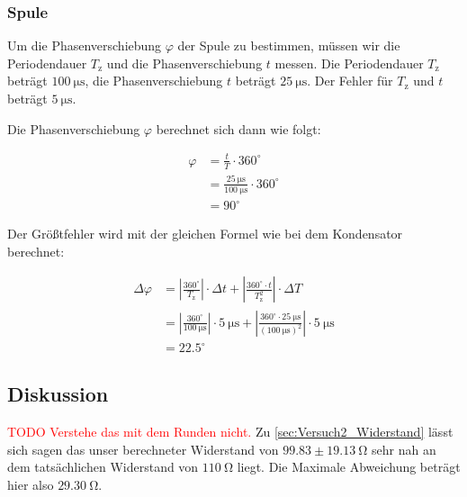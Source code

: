         \subsubsection{Spule}
        \label{sec:Versuch2_Spule}
            
            Um die Phasenverschiebung $\varphi$ der Spule zu bestimmen, müssen wir die Periodendauer $T_{\mathrm{z}}$ und die Phasenverschiebung $t$ messen.
            Die Periodendauer $T_{\mathrm{z}}$ beträgt $100\ \mathrm{\mu s}$, die Phasenverschiebung $t$ beträgt $25\ \mathrm{\mu s}$. Der Fehler für $T_{\mathrm{z}}$ und $t$ beträgt $5\ \mathrm{\mu s}$.

            Die Phasenverschiebung $\varphi$ berechnet sich dann wie folgt:

            \begin{equation}
                \begin{aligned}
                    \varphi &= \frac{t}{T} \cdot 360^{\circ}\\
                         &= \frac{25\ \mathrm{\mu s}}{100\ \mathrm{\mu s}} \cdot 360^{\circ}\\
                         &= 90^{\circ}
                \end{aligned}
                \label{eq:Versuch2_Spule_Phasenverschiebung}
            \end{equation}

            Der Größtfehler wird mit der gleichen Formel wie bei dem Kondensator berechnet:

            \begin{equation}
                \begin{aligned}
                    \Delta \varphi &= \left|\frac{360^{\circ}}{T_{\mathrm{z}}}\right| \cdot \Delta t + \left|\frac{360^{\circ} \cdot t}{T_{\mathrm{z}}^{2}}\right| \cdot \Delta T\\
                                   &= \left|\frac{360^{\circ}}{100\ \mathrm{\mu s}}\right| \cdot 5\ \mathrm{\mu s} + \left|\frac{360^{\circ} \cdot 25\ \mathrm{\mu s}}{(100\ \mathrm{\mu s})^{2}}\right| \cdot 5\ \mathrm{\mu s}\\
                                   &= 22.5^{\circ}
                \end{aligned}
                \label{eq:Versuch2_Spule_Phasenverschiebung_Fehler}
            \end{equation}
             \subsection{Diskussion}
             \textcolor{red}{TODO Verstehe das mit dem Runden nicht.}
             Zu \ref{sec:Versuch2_Widerstand} lässt sich sagen das unser berechneter Widerstand von $99.83 \pm 19.13\ \mathrm{\Omega}$ sehr nah an dem tatsächlichen Widerstand von $110\ \mathrm{\Omega}$ liegt. Die Maximale Abweichung beträgt hier also $29.30\ \mathrm{\Omega}$.

